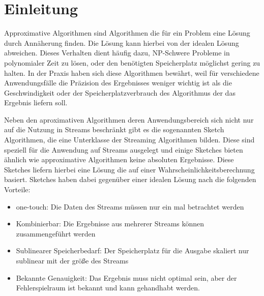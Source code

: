 \section{Einleitung}
Approximative Algorithmen sind Algorithmen die für ein Problem eine Lösung durch Annäherung finden. Die Lösung kann hierbei von der idealen Lösung abweichen. Dieses Verhalten dient häufig dazu, NP-Schwere Probleme in polynomialer Zeit zu lösen, oder den benötigten Speicherplatz möglichst gering zu halten.
In der Praxis haben sich diese Algorithmen bewährt, weil für verschiedene Anwendungsfälle die Präzision des Ergebnisses weniger wichtig ist als die Geschwindigkeit oder der Speicherplatzverbrauch des Algorithmus der das Ergebnis liefern soll.

Neben den aproximativen Algorithmen deren Anwendungsbereich sich nicht nur auf die Nutzung in Streams beschränkt gibt es die sogenannten Sketch Algorithmen, die eine Unterklasse der Streaming Algorithmen bilden. Diese sind speziell für die Anwendung auf Streams ausgelegt und einige Sketches bieten ähnlich wie approximative Algorithmen keine absoluten Ergebnisse. Diese Sketches liefern hierbei eine Lösung die auf einer Wahrscheinlichkeitsberechnung basiert.
Sketches haben dabei gegenüber einer idealen Lösung nach \cite{apachedatasketches} die folgenden Vorteile:
\begin{itemize}
\item one-touch: Die Daten des Streams müssen nur ein mal betrachtet werden
\item Kombinierbar: Die Ergebnisse aus mehrerer Streams können zusammengeführt werden
\item Sublinearer Speicherbedarf: Der Speicherplatz für die Ausgabe skaliert nur sublinear mit der größe des Streams
\item Bekannte Genauigkeit: Das Ergebnis muss nicht optimal sein, aber der Fehlerspielraum ist bekannt und kann gehandhabt werden.
\end{itemize}

